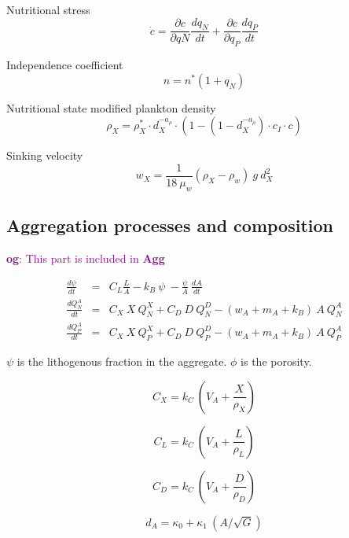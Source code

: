 \documentclass[fleqn]{article}                     %
\newcommand{\comment}[3][darkmagenta]{\textcolor{#1}{\textbf{#2}: #3}}
\begin{document}
Nutritional stress
\begin{equation}
  \dot{c} = \frac{\partial c}{\partial qN}\frac{dq_N}{dt}+\frac{\partial c}{\partial q_P}\frac{dq_P}{dt}
\end{equation}

Independence coefficient
\begin{equation}
  n = n^*(1+q_N)
\end{equation}

Nutritional state modified plankton density
\begin{equation}
  \rho_X = \rho^*_X\cdot d_X^{-a_\rho}\cdot(1-(1-d_X^{-a_\rho})\cdot c_I\cdot  c)
\end{equation}

Sinking velocity
\begin{equation}
  w_X = \frac{1}{18\ \mu_w} (\rho_X-\rho_w)\ g\ d_X^2
\end{equation}

\subsection{Aggregation processes and composition}
\comment{og}{This part is included in \textbf{Agg}}

\begin{eqnarray}
  \frac{d\psi}{dt} &=& C_L \frac{L}{A} - k_B\ \psi\ -\frac{\psi}{A}\ \frac{dA}{dt} \\
  \frac{dQ^A_N}{dt} &=& C_X\ X\ Q^X_N +  C_D\ D\ Q^D_N -(w_A+m_A+k_B)\ A\ Q^A_N\\
  \frac{dQ^A_P}{dt} &=& C_X\ X\ Q^X_P +  C_D\ D\ Q^D_P -(w_A+m_A+k_B)\ A\ Q^A_P
\end{eqnarray}

$\psi$ is the lithogenous fraction in the aggregate.
$\phi$ is the porosity.

\begin{equation}
  C_X = k_C\ \left(V_A+\frac{X}{\rho_X}\right)
\end{equation}

\begin{equation}
  C_L = k_C\ \left(V_A+\frac{L}{\rho_L}\right)
\end{equation}

\begin{equation}
  C_D = k_C\ \left(V_A+\frac{D}{\rho_D}\right)
\end{equation}

\begin{equation}
  d_A = \kappa_0 + \kappa_1\ (A/\sqrt{G})
\end{equation}
\end{document}
